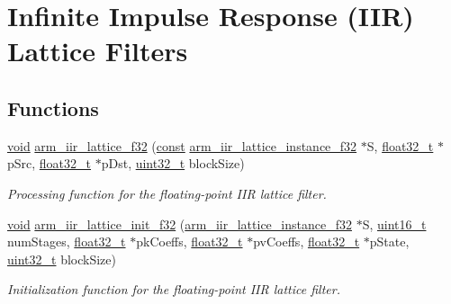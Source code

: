 \hypertarget{group___i_i_r___lattice}{\section{Infinite Impulse Response (I\-I\-R) Lattice Filters}
\label{group___i_i_r___lattice}
}
\subsection*{Functions}
\begin{DoxyCompactItemize}
\item 
\hyperlink{group___n_a_m_e_ga18028b8badbf1ea7e704ccac3c488e82}{void} \hyperlink{group___i_i_r___lattice_ga56164a0fe48619b8ceec160347bdd2ff}{arm\-\_\-iir\-\_\-lattice\-\_\-f32} (\hyperlink{group___n_a_m_e_ga7ae6d0e43244213b34de2c2b9aa30da6}{const} \hyperlink{structarm__iir__lattice__instance__f32}{arm\-\_\-iir\-\_\-lattice\-\_\-instance\-\_\-f32} $\ast$S, \hyperlink{arm__math_8h_a4611b605e45ab401f02cab15c5e38715}{float32\-\_\-t} $\ast$p\-Src, \hyperlink{arm__math_8h_a4611b605e45ab401f02cab15c5e38715}{float32\-\_\-t} $\ast$p\-Dst, \hyperlink{stdint_8h_a435d1572bf3f880d55459d9805097f62}{uint32\-\_\-t} block\-Size)
\begin{DoxyCompactList}\small\item\em Processing function for the floating-\/point I\-I\-R lattice filter. \end{DoxyCompactList}\item 
\hyperlink{group___n_a_m_e_ga18028b8badbf1ea7e704ccac3c488e82}{void} \hyperlink{group___i_i_r___lattice_gaed3b0230bb77439dc902daa625985e04}{arm\-\_\-iir\-\_\-lattice\-\_\-init\-\_\-f32} (\hyperlink{structarm__iir__lattice__instance__f32}{arm\-\_\-iir\-\_\-lattice\-\_\-instance\-\_\-f32} $\ast$S, \hyperlink{stdint_8h_a273cf69d639a59973b6019625df33e30}{uint16\-\_\-t} num\-Stages, \hyperlink{arm__math_8h_a4611b605e45ab401f02cab15c5e38715}{float32\-\_\-t} $\ast$pk\-Coeffs, \hyperlink{arm__math_8h_a4611b605e45ab401f02cab15c5e38715}{float32\-\_\-t} $\ast$pv\-Coeffs, \hyperlink{arm__math_8h_a4611b605e45ab401f02cab15c5e38715}{float32\-\_\-t} $\ast$p\-State, \hyperlink{stdint_8h_a435d1572bf3f880d55459d9805097f62}{uint32\-\_\-t} block\-Size)
\begin{DoxyCompactList}\small\item\em Initialization function for the floating-\/point I\-I\-R lattice filter. \end{DoxyCompactList}\item 

\end{DoxyCompactItemize}
